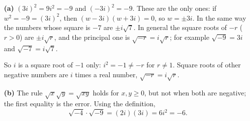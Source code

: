 \textbf{(a)} $(3i)^2=9i^2=-9$ and $(-3i)^2=-9$. These are the only ones: if $w^2=-9=(3i)^2$, then $(w-3i)(w+3i)=0$, so $w=\pm3i$. In the same way the numbers whose square is $-7$ are $\pm i\sqrt7$. In general the square roots of $-r$ ($r>0$) are $\pm i\sqrt r$, and the principal one is $\sqrt{-r}=i\sqrt r$; for example $\sqrt{-9}=3i$ and $\sqrt{-7}=i\sqrt7$.

So $i$ is a square root of $-1$ only: $i^2=-1\ne-r$ for $r\ne1$. Square roots of other negative numbers are $i$ times a real number, $\boxed{\sqrt{-r}=i\sqrt r}$.

\textbf{(b)} The rule $\sqrt x\sqrt y=\sqrt{xy}$ holds for $x,y\ge0$, but not when both are negative; the first equality is the error. Using the definition,
\[\sqrt{-4}\cdot\sqrt{-9}=(2i)(3i)=6i^2=\boxed{-6}.\]
